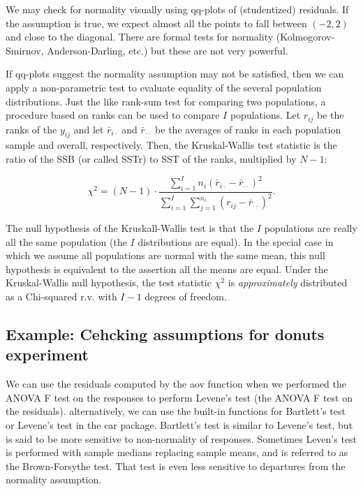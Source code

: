 \documentclass[
]{book}
\begin{document}
We may check for normality visually using qq-plots of (studentized) residuals. If the assumption is true, we expect almost all the points to fall between \((-2,2)\) and close to the diagonal. There are formal tests for normality (Kolmogorov-Smirnov, Anderson-Darling, etc.) but these are not very powerful.

If qq-plots suggest the normality assumption may not be satisfied, then we can apply a non-parametric test to evaluate equality of the several population distributions. Just the like rank-sum test for comparing two populations, a procedure based on ranks can be used to compare \(I\) populations. Let \(r_{ij}\) be the ranks of the \(y_{ij}\) and let \(\bar r_{i\cdot}\) and \(\bar r_{\cdot\cdot}\) be the averages of ranks in each population sample and overall, respectively. Then, the Kruskal-Wallis test statistic is the ratio of the SSB (or called SSTr) to SST of the ranks, multiplied by \(N-1\):

\[\chi^2 = (N-1) \cdot \frac{\sum_{i=1}^I n_{i}(\bar r_{i\cdot} - \bar r_{\cdot\cdot})^2}{\sum_{i=1}^I\sum_{j=1}^{n_i}(r_{ij} - \bar r_{\cdot\cdot})^2}.\]

The null hypothesis of the Kruskall-Wallis test is that the \(I\) populations are really all the same population (the \(I\) distributions are equal). In the special case in which we assume all populations are normal with the same mean, this null hypothesis is equivalent to the assertion all the means are equal. Under the Kruskal-Wallis null hypothesis, the test statistic \(\chi^2\) is \emph{approximately} distributed as a Chi-squared r.v. with \(I-1\) degrees of freedom.\\

\hypertarget{example-cehcking-assumptions-for-donuts-experiment}{%
\subsection{Example: Cehcking assumptions for donuts experiment}\label{example-cehcking-assumptions-for-donuts-experiment}}

We can use the residuals computed by the aov function when we performed the ANOVA F test on the responses to perform Levene's test (the ANOVA F test on the residuals). alternatively, we can use the built-in functions for Bartlett's test or Levene's test in the car package. Bartlett's test is similar to Levene's test, but is said to be more sensitive to non-normality of responses. Sometimes Leven's test is performed with sample medians replacing sample means, and is referred to as the Brown-Forsythe test. That test is even less sensitive to departures from the normality assumption.
\end{document}
